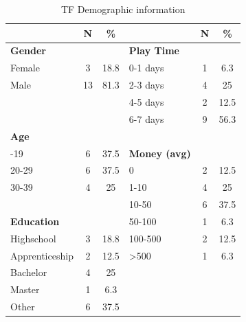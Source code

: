 \begin{table}
\begin{center}
 \begin{tabular}{p{2cm} c c p{2cm} c c}
  \hline
  &  N & \% & & N & \% \\ 
 \hline
  \textbf{Gender} &  &  & \textbf{Play Time} &  &  \\ 
 Female & 3 & 18.8 & 0-1 days & 1 & 6.3 \\
 Male & 13 & 81.3  & 2-3 days & 4 & 25 \\
 & &  &    4-5 days & 2 & 12.5 \\
    &  &  & 6-7 days & 9 & 56.3  \\ 
    
  \textbf{Age} & & & & &\\
 -19 & 6 & 37.5 &  \textbf{Money (avg)}\\
  20-29 & 6 & 37.5 &  0 & 2 & 12.5\\
  30-39 & 4 & 25 &  1-10 & 4 & 25\\
   &  &  &  10-50 & 6 & 37.5\\
  \textbf{Education} &  &  &  50-100 & 1 & 6.3\\
   Highschool & 3 & 18.8 &  100-500 & 2 & 12.5\\
   Apprenticeship & 2 & 12.5 &  >500 & 1 & 6.3\\
 Bachelor & 4 & 25 &  \\
 Master & 1 & 6.3 &  \\
 Other & 6 & 37.5 &  \\
 
  \hline
\end{tabular}
\end{center}
\caption{TF Demographic information}
\label{table:dem-fortnite}
\end{table}




\FloatBarrier


